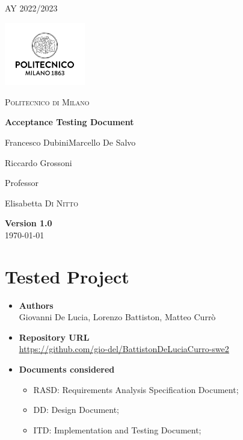 \documentclass[table, 12pt]{article}
\begin{document}
\begin{titlepage}
    \centering
    {\scshape\large AY 2022/2023 \par}
    \vfill
    \includegraphics[width=100pt]{assets/logo_polimi}\par\vspace{1cm}
    {\scshape\LARGE Politecnico di Milano \par}
    \vspace{1.5cm}
    {\huge\bfseries Acceptance Testing Document \par}
    \vspace{2cm}
    {\Large {Francesco Dubini\quad Marcello De Salvo\quad\par Riccardo Grossoni}\par}
    \vfill
    {\large Professor\par
        Elisabetta \textsc{Di Nitto}}
    \vfill
    {\large \textbf{Version 1.0} \\ \today \par}
\end{titlepage}
\thispagestyle{plain}
\mbox{}
\newpage
{}
\tableofcontents
\newpage
{}

\section{Tested Project}
\begin{itemize}
    \item \textbf{Authors}
    \\Giovanni De Lucia, Lorenzo Battiston, Matteo Currò
    \item \textbf{Repository URL}\\ \underline{\url{https://github.com/gio-del/BattistonDeLuciaCurro-swe2}}
    \item \textbf{Documents considered}\begin{itemize}
              \item RASD: Requirements Analysis Specification Document;
              \item DD: Design Document;
              \item ITD: Implementation and Testing Document;
          \end{itemize}
\end{itemize}
\newpage
\end{document}
